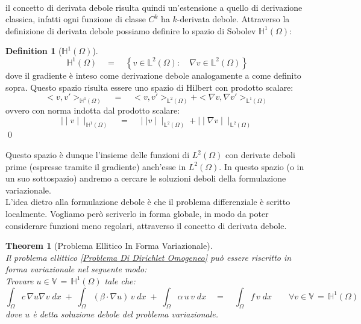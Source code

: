 \documentclass[12pt,a4paper]{report}
\theoremstyle{theorem}
\newtheorem{theorem}{Theorem}[section]
\theoremstyle{definition}
\newtheorem{definition}{Definition}[section]
\begin{document}
\hfill \\
il concetto di derivata debole risulta quindi un'estensione a quello di derivazione classica, infatti ogni funzione di classe $C^k$ ha $k$-derivata debole.
Attraverso la definizione di derivata debole possiamo definire lo spazio di Sobolev $\mathbb{H}^{1}(\Omega)$:
\begin{definition} [\textbf{$\mathbb{H}^{1}(\Omega)$}]  \label{Spazio H1}
\hfill \\
\[ \mathbb{H}^{1}(\Omega) \quad = \quad \left \{ v \in \mathbb{L}^{2}(\Omega): \quad \nabla{v} \in \mathbb{L}^{2}(\Omega) \right \}	\]
dove il gradiente è inteso come derivazione debole analogamente a come definito sopra. Questo spazio risulta essere uno spazio di Hilbert con prodotto scalare:
\[ < v, v' >_{\mathbb{H}^{1}(\Omega)} \quad = \quad < v, v' >_{\mathbb{L}^{2}(\Omega)} + < \nabla{v}, \nabla{v}' >_{\mathbb{L}^{1}(\Omega)}\]
ovvero con norma indotta dal prodotto scalare:
\[ \mid \mid v \mid \mid _{\mathbb{H}^{1}(\Omega)}\quad = \quad \mid \mid v \mid \mid _{\mathbb{L}^{2}(\Omega)} + \mid \mid \nabla{v} \mid \mid _{\mathbb{L}^{2}(\Omega)} \]
\qed
\end{definition}
Questo spazio è dunque l'insieme delle funzioni di $L^{2}(\Omega)$ con derivate deboli prime (espresse tramite il gradiente) anch'esse in $L^{2}(\Omega)$. In questo spazio (o in un suo sottospazio) andremo a cercare le soluzioni deboli della formulazione variazionale. \\
L'idea dietro alla formulazione debole è che il problema differenziale è scritto localmente. Vogliamo però scriverlo in forma globale, in modo da poter considerare funzioni meno regolari, attraverso il concetto di derivata debole.\\
\begin{theorem} [Problema Ellitico In Forma Variazionale]  \label{Problema Ellittico Debole}
\hfill \\
Il problema ellittico \ref{Problema Di Dirichlet Omogeneo} può essere riscritto in forma variazionale nel seguente modo:\\
Trovare $u \in  \mathbb{V} \, = \, \mathbb{H}^{1}(\Omega)$ tale che:
\[ \int_{\Omega}{c \, \nabla u \nabla v \; dx} \; + \; \int_{\Omega}{(\beta \cdot \nabla u) \, v \; dx} \; + \; \int_{\Omega}{\alpha \, u \, v \; dx} \quad = \quad \int_{\Omega}{f \, v \; dx} \qquad \forall v \in \mathbb{V} \, = \, \mathbb{H}^{1}(\Omega) \]
dove $u$ è detta soluzione debole del problema variazionale.
\end{theorem}
\end{document}
